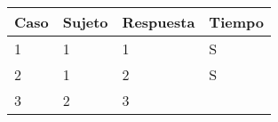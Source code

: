 \documentclass[12pt,spanish,a4paper,]{article}
\begin{document}
\begin{enumerate}
  \begin{longtable}[]{@{}llll@{}}
  \toprule
  \begin{minipage}[b]{0.06\columnwidth}\raggedright
  Caso\strut
  \end{minipage} & \begin{minipage}[b]{0.09\columnwidth}\raggedright
  Sujeto\strut
  \end{minipage} & \begin{minipage}[b]{0.12\columnwidth}\raggedright
  Respuesta\strut
  \end{minipage} & \begin{minipage}[b]{0.09\columnwidth}\raggedright
  Tiempo\strut
  \end{minipage}\tabularnewline
  \midrule
  \endhead
  \begin{minipage}[t]{0.06\columnwidth}\raggedright
  1\strut
  \end{minipage} & \begin{minipage}[t]{0.09\columnwidth}\raggedright
  1\strut
  \end{minipage} & \begin{minipage}[t]{0.12\columnwidth}\raggedright
  1\strut
  \end{minipage} & \begin{minipage}[t]{0.09\columnwidth}\raggedright
  S\strut
  \end{minipage}\tabularnewline
  \begin{minipage}[t]{0.06\columnwidth}\raggedright
  2\strut
  \end{minipage} & \begin{minipage}[t]{0.09\columnwidth}\raggedright
  1\strut
  \end{minipage} & \begin{minipage}[t]{0.12\columnwidth}\raggedright
  2\strut
  \end{minipage} & \begin{minipage}[t]{0.09\columnwidth}\raggedright
  S\strut
  \end{minipage}\tabularnewline
  \begin{minipage}[t]{0.06\columnwidth}\raggedright
  3\strut
  \end{minipage} & \begin{minipage}[t]{0.09\columnwidth}\raggedright
  2\strut
  \end{minipage} & \begin{minipage}[t]{0.12\columnwidth}\raggedright
  3\strut
  \end{minipage} & \begin{minipage}[t]{0.09\columnwidth}\raggedright

\end{minipage}
\end{longtable}
\end{enumerate}
\end{document}
